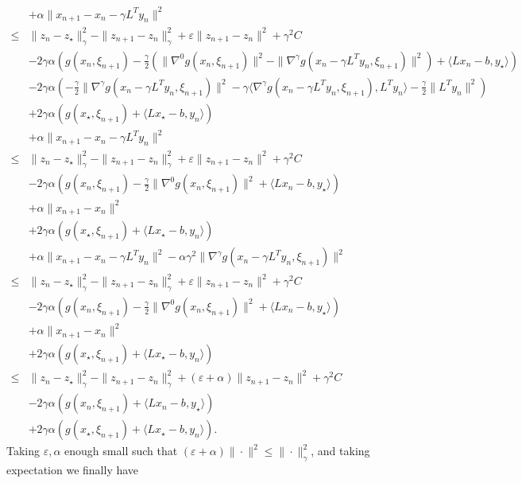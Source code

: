 \documentclass{article}
\newcommand{\ps}[1]{\langle #1 \rangle}
\theoremstyle{definition}
\begin{document}
\begin{align*}
& + \alpha\|x_{n+1} - x_n - \gamma L^T y_n\|^2\\
\leq &\|z_{n} - z_\star\|_\gamma^2 - \|z_{n+1} - z_{n}\|_\gamma^2 + \varepsilon \|z_{n+1} - z_{n}\|^2 + \gamma^2 C \\
& -2\gamma\alpha \left( g(x_{n},\xi_{n+1}) - \frac{\gamma}{2}\left(\|\nabla^0 g(x_{n},\xi_{n+1})\|^2 - \|\nabla^\gamma g(x_n-\gamma L^T y_n,\xi_{n+1})\|^2\right) + \ps{L x_{n}-b,y_\star} \right)\\
&-2\gamma\alpha \left(-\frac{\gamma}{2}\|\nabla^\gamma g(x_n-\gamma L^T y_n,\xi_{n+1})\|^2 - \gamma\ps{\nabla^\gamma g(x_n-\gamma L^T y_n,\xi_{n+1}), L^T y_n} - \frac{\gamma}{2}\|L^T y_n\|^2 \right) \\
& +2\gamma \alpha\left( g(x_\star,\xi_{n+1}) + \ps{L x_\star-b,y_{n}} \right)\\
& +\alpha \|x_{n+1} - x_n - \gamma L^T y_n\|^2\\
\leq &\|z_{n} - z_\star\|_\gamma^2 - \|z_{n+1} - z_{n}\|_\gamma^2 + \varepsilon \|z_{n+1} - z_{n}\|^2 + \gamma^2 C \\
& -2\gamma\alpha \left( g(x_{n},\xi_{n+1}) - \frac{\gamma}{2}\|\nabla^0 g(x_{n},\xi_{n+1})\|^2 + \ps{L x_{n}-b,y_\star} \right)\\
& + \alpha\|x_{n+1} - x_n\|^2 \\
& +2\gamma \alpha\left( g(x_\star,\xi_{n+1}) + \ps{L x_\star-b,y_{n}} \right)\\
& + \alpha\|x_{n+1} - x_n - \gamma L^T y_n\|^2 - \alpha\gamma^2 \|\nabla^\gamma g(x_n-\gamma L^T y_n,\xi_{n+1})\|^2\\
\leq &\|z_{n} - z_\star\|_\gamma^2 - \|z_{n+1} - z_{n}\|_\gamma^2 + \varepsilon \|z_{n+1} - z_{n}\|^2 + \gamma^2 C \\
& -2\gamma\alpha \left( g(x_{n},\xi_{n+1}) - \frac{\gamma}{2}\|\nabla^0 g(x_{n},\xi_{n+1})\|^2 + \ps{L x_{n}-b,y_\star} \right)\\
& + \alpha\|x_{n+1} - x_n\|^2 \\
& +2\gamma\alpha \left( g(x_\star,\xi_{n+1}) + \ps{L x_\star-b,y_{n}} \right)\\
\leq &\|z_{n} - z_\star\|_\gamma^2 - \|z_{n+1} - z_{n}\|_\gamma^2 + (\varepsilon + \alpha) \|z_{n+1} - z_{n}\|^2 + \gamma^2 C \\
& -2\gamma\alpha \left( g(x_{n},\xi_{n+1}) + \ps{L x_{n}-b,y_\star} \right)\\
& +2\gamma\alpha \left( g(x_\star,\xi_{n+1}) + \ps{L x_\star-b,y_{n}} \right).
\end{align*}
Taking $\varepsilon, \alpha$ enough small such that $(\varepsilon + \alpha) \|\cdot\|^2 \leq \|\cdot\|_\gamma^2$, and taking expectation we finally have
\end{document}
